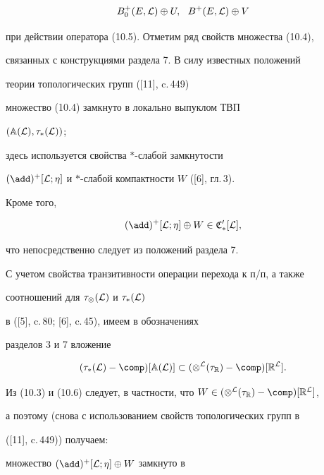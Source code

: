 $$


{B_0^+}(E,{\cal L}) \oplus U,\ \ {B^+}(E,{\cal L}) \oplus V


$$


при действии оператора (10.5). Отметим ряд свойств множества (10.4),


связанных с конструкциями раздела 7. В силу известных положений


теории топологических групп ([11], c.\,449)


множество (10.4) замкнуто в локально выпуклом ТВП


$({{\Bbb A}({\cal L})},{{\tau}_*}({\cal L}))$;


здесь используется свойства $*$-слабой замкнутости


${(\add)^+}[{\cal L};\eta]$ и $*$-слабой компактности $W$ ([6], гл.\,3).


Кроме того,


$$


{(\add)^+}[{\cal L};\eta] \oplus W \in {{\frak C}'_*}[{\cal


L}],


$$


что непосредственно следует из положений раздела 7.


С учетом свойства транзитивности операции перехода к п/п, а также


соотношений для ${{\tau}_\otimes}({\cal L})$ и ${{\tau}_*}({\cal L})$


в ([5], c.\,80; [6], c.\,45), имеем в обозначениях


разделов 3 и 7 вложение


\begin{equation}


({{\tau}_*}({\cal L}) - {\comp})[{\Bbb A}({\cal L})] \subset


({{\otimes}^{\cal L}}({{\tau}_{\Bbb R}}) - {\comp})[{{\Bbb R}^{\cal L}}].


\end{equation}





Из (10.3) и (10.6) следует, в частности, что $W \in


({{\otimes}^{\cal L}}({\tau}_{\Bbb R}) - {\comp})[{\Bbb R}^{\cal L}]$,


а поэтому (снова с использованием свойств топологических групп в


([11], c.\,449)) получаем:


множество ${(\add)^+}[{\cal L};\eta] \oplus W$ замкнуто в


